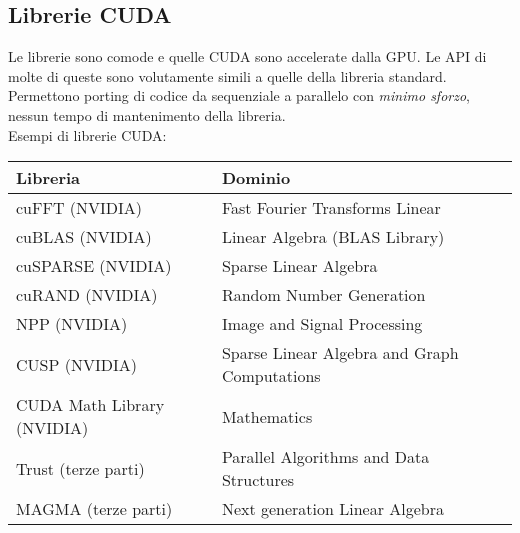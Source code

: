 
\subsection{Librerie CUDA}
Le librerie sono comode e quelle CUDA sono accelerate dalla GPU. Le API di molte di queste sono volutamente simili a quelle della libreria standard. Permettono porting di codice da sequenziale a parallelo con \textit{minimo sforzo}, nessun tempo di mantenimento della libreria.\\

Esempi di librerie CUDA:
\begin{center}
	\begin{tabular}{@{} ll @{}}
		\hline
		\textbf{Libreria}                     & \textbf{Dominio}                                    \\ \hline
		cuFFT (NVIDIA)                        & Fast Fourier Transforms Linear                      \\
		cuBLAS (NVIDIA)                       & Linear Algebra (BLAS Library)                       \\
		cuSPARSE (NVIDIA)                     & Sparse Linear Algebra                               \\
		cuRAND (NVIDIA)                       & Random Number Generation                            \\
		NPP (NVIDIA)                          & Image and Signal Processing                         \\
		CUSP (NVIDIA)                         & Sparse Linear Algebra and Graph Computations        \\
		CUDA Math Library (NVIDIA)            & Mathematics                                         \\
		Trust (terze parti)                   & Parallel Algorithms and Data Structures             \\
		MAGMA (terze parti)                   & Next generation Linear Algebra                      \\ \hline
	\end{tabular}
\end{center}

